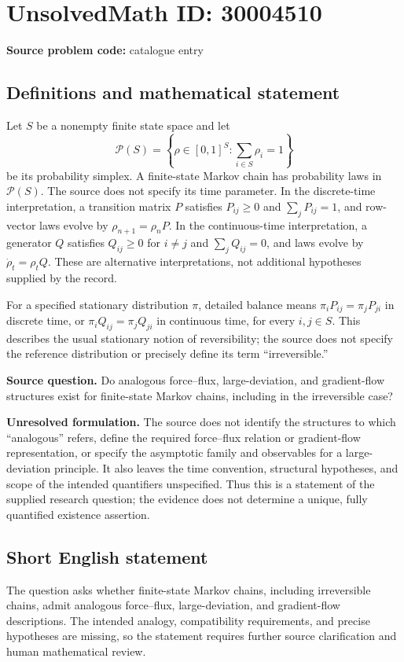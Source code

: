 \documentclass[11pt]{article}
\begin{document}
\section*{UnsolvedMath ID: 30004510}
\textbf{Source problem code:} catalogue entry
\subsection{Definitions and mathematical statement}
Let \(S\) be a nonempty finite state space and let
\[
\mathcal P(S)=\left\{\rho\in[0,1]^S:\sum_{i\in S}\rho_i=1\right\}
\]
be its probability simplex. A finite-state Markov chain has probability laws in \(\mathcal P(S)\). The source does not specify its time parameter. In the discrete-time interpretation, a transition matrix \(P\) satisfies \(P_{ij}\geq0\) and \(\sum_jP_{ij}=1\), and row-vector laws evolve by \(\rho_{n+1}=\rho_nP\). In the continuous-time interpretation, a generator \(Q\) satisfies \(Q_{ij}\geq0\) for \(i\ne j\) and \(\sum_jQ_{ij}=0\), and laws evolve by \(\dot\rho_t=\rho_tQ\). These are alternative interpretations, not additional hypotheses supplied by the record.

For a specified stationary distribution \(\pi\), detailed balance means \(\pi_iP_{ij}=\pi_jP_{ji}\) in discrete time, or \(\pi_iQ_{ij}=\pi_jQ_{ji}\) in continuous time, for every \(i,j\in S\). This describes the usual stationary notion of reversibility; the source does not specify the reference distribution or precisely define its term ``irreversible.''

\textbf{Source question.} Do analogous force--flux, large-deviation, and gradient-flow structures exist for finite-state Markov chains, including in the irreversible case?

\textbf{Unresolved formulation.} The source does not identify the structures to which ``analogous'' refers, define the required force--flux relation or gradient-flow representation, or specify the asymptotic family and observables for a large-deviation principle. It also leaves the time convention, structural hypotheses, and scope of the intended quantifiers unspecified. Thus this is a statement of the supplied research question; the evidence does not determine a unique, fully quantified existence assertion.
\subsection{Short English statement}
The question asks whether finite-state Markov chains, including irreversible chains, admit analogous force--flux, large-deviation, and gradient-flow descriptions. The intended analogy, compatibility requirements, and precise hypotheses are missing, so the statement requires further source clarification and human mathematical review.
\end{document}
